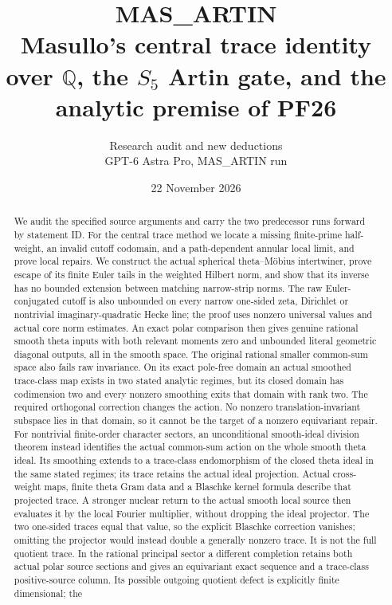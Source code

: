 \documentclass[11pt,a4paper]{article}
\title{MAS\_ARTIN\\[5pt]\large Masullo's central trace identity over
$\mathbb Q$, the $S_5$ Artin gate, and the analytic premise of PF26}
\author{Research audit and new deductions\\GPT-6 Astra Pro, MAS\_ARTIN run}
\date{22 November 2026\\\small\RunStatus}
\begin{document}
\maketitle
\begin{abstract}
We audit the specified source arguments and carry the two predecessor
runs forward by statement ID. For the central trace method we locate
a missing finite-prime half-weight, an invalid cutoff codomain, and
a path-dependent annular local limit, and prove local repairs. We
construct the actual spherical theta--M\"obius intertwiner, prove
escape of its finite Euler tails in the weighted Hilbert norm, and
show that its inverse has no bounded extension between matching
narrow-strip norms. The raw Euler-conjugated cutoff is also unbounded on every
narrow one-sided zeta, Dirichlet or nontrivial imaginary-quadratic
Hecke line; the proof uses
nonzero universal values and actual core norm estimates.
An exact polar comparison then gives genuine rational smooth
theta inputs with both relevant moments zero and unbounded
literal geometric diagonal outputs, all in the smooth space.
The original rational smaller common-sum space also fails
raw invariance. On its exact pole-free domain an actual
smoothed trace-class map exists in two stated analytic regimes,
but its closed domain has codimension two and every nonzero
smoothing exits that domain with rank two. The required
orthogonal correction changes the action. No nonzero
translation-invariant subspace lies in that domain, so it
cannot be the target of a nonzero equivariant repair.
For nontrivial finite-order character sectors, an unconditional
smooth-ideal division theorem instead identifies the actual
common-sum action on the whole smooth theta ideal. Its smoothing
extends to a trace-class endomorphism of the closed theta ideal
in the same stated regimes; its trace retains the actual ideal
projection. Actual cross-weight maps, finite theta Gram data and
a Blaschke kernel formula describe that projected trace. A
stronger nuclear return to the actual smooth local source then
evaluates it by the local Fourier multiplier, without dropping
the ideal projector. The two one-sided traces equal that value,
so the explicit Blaschke correction vanishes; omitting the
projector would instead double a generally nonzero trace.
It is not the full quotient trace. In the
rational principal sector a different completion retains both
actual polar source sections and gives an equivariant exact
sequence and a trace-class positive-source column. Its possible
outgoing quotient defect is explicitly finite dimensional; the

\end{abstract}
\end{document}
